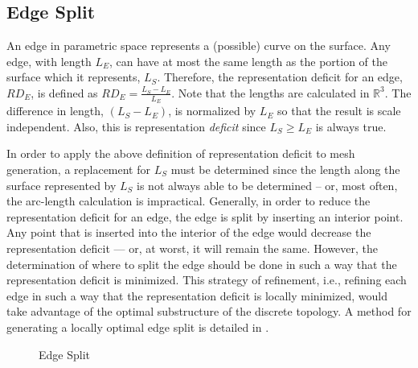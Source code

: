 \subsection{Edge Split}
An edge in parametric space represents a (possible) curve on the
surface. Any edge, with length $L_E$, can have at most the same length
as the portion of the surface which it represents, $L_S$. Therefore, the
representation deficit for an edge, $RD_E$, is defined as $RD_E =
\frac{L_S - L_E}{L_E}$. Note that the lengths are calculated in
${\mathbb R}^3$. The difference in length, $\left(L_S - L_E\right)$, is
normalized by $L_E$ so that the result is scale independent. Also, this
is representation {\it deficit} since $L_S \ge L_E$ is always true.

In order to apply the above definition of representation deficit to mesh
generation, a replacement for $L_S$ must be determined since the length
along the surface represented by $L_S$ is not always able to be
determined -- or, most often, the arc-length calculation is impractical.
Generally, in order to reduce the representation deficit for an edge, the
edge is split by inserting an interior point. Any point that is inserted
into the interior of the edge would decrease the representation deficit
--- or, at worst, it will remain the same. However, the determination of
where to split the edge should be done in such a way that the
representation deficit is minimized. This strategy of refinement,
i.e., refining each edge in such a way that the representation deficit is
locally minimized, would take advantage of the optimal substructure of
the discrete topology. A method for generating a locally optimal edge
split is detailed in \cite{mclaurin12,mclaurin13}.

\begin{figure}[h!]
  \caption{Edge Split}
\end{figure}

